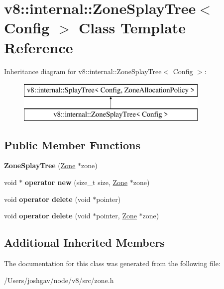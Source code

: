 \hypertarget{classv8_1_1internal_1_1_zone_splay_tree}{}\section{v8\+:\+:internal\+:\+:Zone\+Splay\+Tree$<$ Config $>$ Class Template Reference}
\label{classv8_1_1internal_1_1_zone_splay_tree}
Inheritance diagram for v8\+:\+:internal\+:\+:Zone\+Splay\+Tree$<$ Config $>$\+:\begin{figure}[H]
\begin{center}
\leavevmode
\includegraphics[height=2.000000cm]{classv8_1_1internal_1_1_zone_splay_tree}
\end{center}
\end{figure}
\subsection*{Public Member Functions}
\begin{DoxyCompactItemize}
\item 
{\bfseries Zone\+Splay\+Tree} (\hyperlink{classv8_1_1internal_1_1_zone}{Zone} $\ast$zone)\hypertarget{classv8_1_1internal_1_1_zone_splay_tree_a6868fea9a91c5e1fc46f1abf51dd7af8}{}\label{classv8_1_1internal_1_1_zone_splay_tree_a6868fea9a91c5e1fc46f1abf51dd7af8}

\item 
void $\ast$ {\bfseries operator new} (size\+\_\+t size, \hyperlink{classv8_1_1internal_1_1_zone}{Zone} $\ast$zone)\hypertarget{classv8_1_1internal_1_1_zone_splay_tree_a5da53044bc282b029dd77c91e5999a88}{}\label{classv8_1_1internal_1_1_zone_splay_tree_a5da53044bc282b029dd77c91e5999a88}

\item 
void {\bfseries operator delete} (void $\ast$pointer)\hypertarget{classv8_1_1internal_1_1_zone_splay_tree_aafa8e3637ae4d23427728fbc49a5e2f5}{}\label{classv8_1_1internal_1_1_zone_splay_tree_aafa8e3637ae4d23427728fbc49a5e2f5}

\item 
void {\bfseries operator delete} (void $\ast$pointer, \hyperlink{classv8_1_1internal_1_1_zone}{Zone} $\ast$zone)\hypertarget{classv8_1_1internal_1_1_zone_splay_tree_aea0e42a989045676e5ae837b96397d48}{}\label{classv8_1_1internal_1_1_zone_splay_tree_aea0e42a989045676e5ae837b96397d48}

\end{DoxyCompactItemize}
\subsection*{Additional Inherited Members}


The documentation for this class was generated from the following file\+:\begin{DoxyCompactItemize}
\item 
/\+Users/joshgav/node/v8/src/zone.\+h\end{DoxyCompactItemize}
